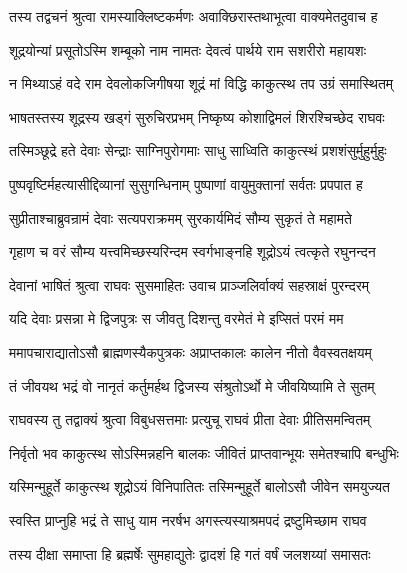 
\twolineshloka
{तस्य तद्वचनं श्रुत्वा रामस्याक्लिष्टकर्मणः}
{अवाक्छिरास्तथाभूत्वा वाक्यमेतदुवाच ह} %

\twolineshloka
{शूद्रयोन्यां प्रसूतोऽस्मि शम्बूको नाम नामतः}
{देवत्वं पार्थये राम सशरीरो महायशः} %

\twolineshloka
{न मिथ्याऽहं वदे राम देवलोकजिगीषया}
{शूद्रं मां विद्धि काकुत्स्थ तप उग्रं समास्थितम्} %

\twolineshloka
{भाषतस्तस्य शूद्रस्य खड्गं सुरुचिरप्रभम्}
{निष्कृष्य कोशाद्विमलं शिरश्चिच्छेद राघवः} %

\twolineshloka
{तस्मिञ्छूद्रे हते देवाः सेन्द्राः साग्निपुरोगमाः}
{साधु साध्विति काकुत्स्थं प्रशशंसुर्मुहुर्मुहुः} %

\twolineshloka
{पुष्पवृष्टिर्महत्यासीद्दिव्यानां सुसुगन्धिनाम्}
{पुष्पाणां वायुमुक्तानां सर्वतः प्रपपात ह} %

\twolineshloka
{सुप्रीताश्चाब्रुवन्रामं देवाः सत्यपराक्रमम्}
{सुरकार्यमिदं सौम्य सुकृतं ते महामते} %

\twolineshloka
{गृहाण च वरं सौम्य यत्त्वमिच्छस्यरिन्दम}
{स्वर्गभाङ्नहि शूद्रोऽयं त्वत्कृते रघुनन्दन} %

\twolineshloka
{देवानां भाषितं श्रुत्वा राघवः सुसमाहितः}
{उवाच प्राञ्जलिर्वाक्यं सहस्राक्षं पुरन्दरम्} %

\twolineshloka
{यदि देवाः प्रसन्ना मे द्विजपुत्रः स जीवतु}
{दिशन्तु वरमेतं मे इप्सितं परमं मम} %

\twolineshloka
{ममापचाराद्यातोऽसौ ब्राह्मणस्यैकपुत्रकः}
{अप्राप्तकालः कालेन नीतो वैवस्वतक्षयम्} %

\twolineshloka
{तं जीवयथ भद्रं वो नानृतं कर्तुमर्हथ}
{द्विजस्य संश्रुतोऽर्थो मे जीवयिष्यामि ते सुतम्} %

\twolineshloka
{राघवस्य तु तद्वाक्यं श्रुत्वा विबुधसत्तमाः}
{प्रत्युचू राघवं प्रीता देवाः प्रीतिसमन्वितम्} %

\twolineshloka
{निर्वृतो भव काकुत्स्थ सोऽस्मिन्नहनि बालकः}
{जीवितं प्राप्तवान्भूयः समेतश्चापि बन्धुभिः} %

\twolineshloka
{यस्मिन्मुहूर्ते काकुत्स्थ शूद्रोऽयं विनिपातितः}
{तस्मिन्मुहूर्ते बालोऽसौ जीवेन समयुज्यत} %

\twolineshloka
{स्वस्ति प्राप्नुहि भद्रं ते साधु याम नरर्षभ}
{अगस्त्यस्याश्रमपदं द्रष्टुमिच्छाम राघव} %

\twolineshloka
{तस्य दीक्षा समाप्ता हि ब्रह्मर्षेः सुमहाद्युतेः}
{द्वादशं हि गतं वर्षं जलशय्यां समासतः} %

